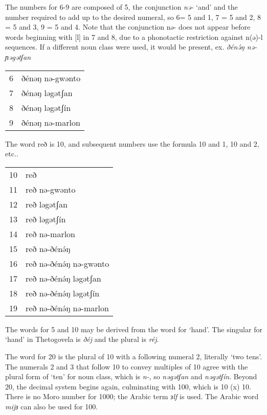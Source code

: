 The numbers for 6-9 are composed of 5, the conjunction \textit{nə-} ‘and’ and the number required to add up to the desired numeral, so 6= 5 and 1, 7 = 5 and 2, 8 = 5 and 3, 9 =  5 and 4. Note that the conjunction nə- does not appear before words beginning with [l] in 7 and 8, due to a phonotactic restriction against n(ə)-l sequences. If a different noun class were used, it would be present, ex. \textit{ðénə́ŋ nə-ɲəgətʃan}

\ea \begin{tabular}[t]{ll}
6 &	ðénəŋ nə-gwənto \\
7 &	ðénəŋ ləgətʃan \\ 
8 &	ðénəŋ ləgətʃín\\ 
9 &	ðénəŋ nə-marlon\\
  \end{tabular}
\z

The word reð is 10, and subsequent numbers use the formula 10 and 1, 10 and 2, etc.. 

\ea \begin{tabular}[t]{ll}
10 & reð\\
11 & reð nə-gwənto\\
12 & reð ləgətʃan\\
13 & reð ləgətʃín\\
14 & reð nə-marlon\\
15 & reð nə-ðénə́ŋ\\
16 & reð nə-ðénə́ŋ nə-gwənto  \\
17 & reð nə-ðénə́ŋ ləgətʃan\\
18 & reð nə-ðénə́ŋ ləgətʃín  \\
19 & reð nə-ðénə́ŋ nə-marlon  \\
   \end{tabular}
\z
	
The words for 5 and 10 may be derived from the word for ‘hand’. The singular for ‘hand’ in Thetogovela is \textit{ðéj} and the plural is \textit{réj}.

The word for 20 is the plural of 10 with a following numeral 2, literally `two tens'. The numerals 2 and 3 that follow 10 to convey multiples of 10 agree with the plural form of `ten' for noun class, which is \textit{n-}, so \textit{nəgətʃan} and \textit{nəgətʃín}. Beyond 20, the decimal system begins again, culminating with 100, which is 10 (x) 10. There is no Moro number for 1000; the Arabic term \textit{ɜlf} is used. The Arabic word \textit{mijɜ} can also be used for 100. 

